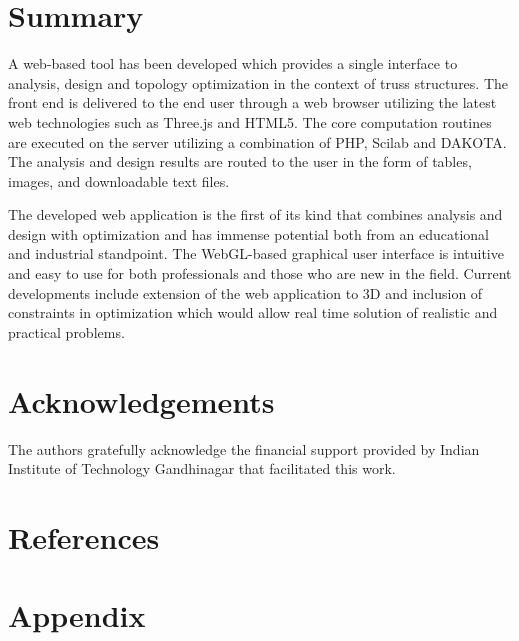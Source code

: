 \documentclass[preprint]{elsarticle}
\begin{document}
\section{Summary} 
\label{Summary}
A web-based tool has been developed which provides a single
interface to analysis, design and topology optimization in
the context of truss structures. The front end is delivered to the end user
through a web browser utilizing the latest web technologies such as Three.js and
HTML5. The core computation routines are executed on the server utilizing a
combination of PHP, Scilab and DAKOTA. The analysis and design results are
routed to the user in the form of tables, images, and downloadable text files.

The developed web application is the first of its kind that combines analysis
and design with optimization and has immense potential both from an educational
and industrial standpoint. The WebGL-based graphical user interface is intuitive
and easy to use for both professionals and those who are new in the field.
Current developments include extension of the web application to 3D and inclusion of constraints in optimization which would allow real time solution of realistic and practical problems. 


\section*{Acknowledgements} 
The authors gratefully acknowledge the financial support provided by Indian
Institute of Technology Gandhinagar that facilitated this work.

\section{References} 

\appendix
\section*{Appendix}
\end{document}
